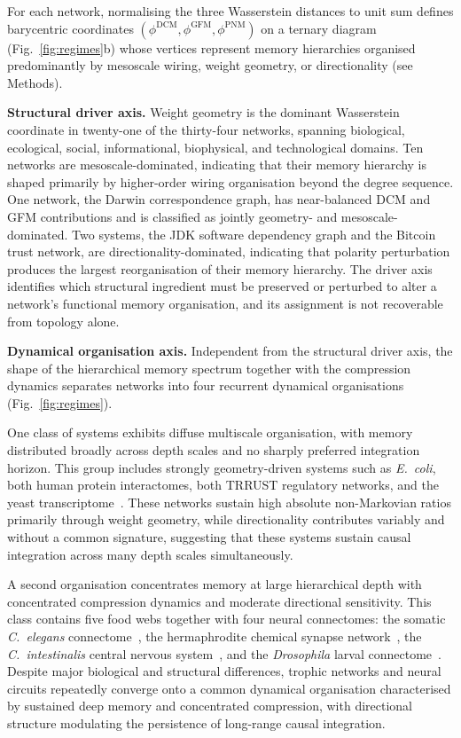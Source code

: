 \documentclass[aps,superscriptaddress,11pt]{revtex4-2}
\theoremstyle{definition}
\theoremstyle{plain}
\begin{document}
For each network, normalising the three Wasserstein distances to unit sum
defines barycentric coordinates $(\phi^{\mathrm{DCM}},
 \phi^{\mathrm{GFM}},
 \phi^{\mathrm{PNM}})$ on a ternary diagram
(Fig.~\ref{fig:regimes}b) whose vertices represent memory hierarchies
organised predominantly by mesoscale wiring, weight geometry, or
directionality (see Methods).



\medskip
\noindent
\textbf{Structural driver axis.}
Weight geometry is the dominant Wasserstein coordinate in twenty-one of the
thirty-four networks, spanning biological, ecological, social, informational,
biophysical, and technological domains. Ten networks are mesoscale-dominated,
indicating that their memory hierarchy is shaped primarily by higher-order
wiring organisation beyond the degree sequence. One network, the Darwin
correspondence graph, has near-balanced DCM and GFM contributions and is
classified as jointly geometry- and mesoscale-dominated. Two systems, the
JDK software dependency graph and the Bitcoin trust network, are
directionality-dominated, indicating that polarity perturbation produces the
largest reorganisation of their memory hierarchy. The driver axis identifies
which structural ingredient must be preserved or perturbed to alter a
network's functional memory organisation, and its assignment is not
recoverable from topology alone.

\medskip
\noindent
\textbf{Dynamical organisation axis.}
Independent from the structural driver axis, the shape of the hierarchical
memory spectrum together with the compression dynamics separates networks
into four recurrent dynamical organisations
(Fig.~\ref{fig:regimes}).

One class of systems exhibits diffuse multiscale organisation, with memory
distributed broadly across depth scales and no sharply preferred integration
horizon. This group includes strongly geometry-driven systems such as
\textit{E.~coli}, both human protein interactomes, both TRRUST regulatory
networks, and the yeast transcriptome~\cite{ShenOrr2002,Ewing2007,Stelzl2005,Han2015}.
These networks sustain high absolute non-Markovian ratios primarily through
weight geometry, while directionality contributes variably and without a
common signature, suggesting that these systems sustain causal integration
across many depth scales simultaneously.

A second organisation concentrates memory at large hierarchical depth with
concentrated compression dynamics and moderate directional sensitivity.
This class contains five food webs together with four neural connectomes:
the somatic \textit{C.~elegans} connectome~\cite{Varshney2011,Cook2019,Moutuou2025a},
the hermaphrodite chemical synapse network~\cite{Cook2019},
the \textit{C.~intestinalis} central nervous
system~\cite{Ryan2016}, and the \textit{Drosophila} larval
connectome~\cite{Winding2023}. Despite major biological and structural
differences, trophic networks and neural circuits repeatedly converge onto
a common dynamical organisation characterised by sustained deep memory and
concentrated compression, with directional structure modulating the
persistence of long-range causal integration.
\end{document}
